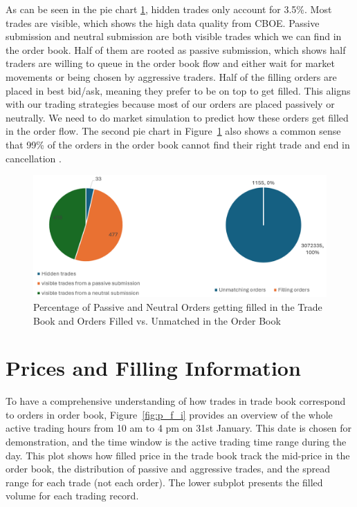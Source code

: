 As can be seen in the pie chart \ref{fig:p_of_AT_unma}, hidden trades only account for 3.5\%. Most trades are visible, which shows the high data quality from CBOE. Passive submission and neutral submission are both visible trades which we can find in the order book. Half of them are rooted as passive submission, which shows half traders are willing to queue in the order book flow and either wait for market movements or being chosen by aggressive traders. Half of the filling orders are placed in best bid/ask, meaning they prefer to be on top to get filled. This aligns with our trading strategies because most of our orders are placed passively or neutrally. We need to do market simulation to predict how these orders get filled in the order flow. The second pie chart in Figure~\ref{fig:p_of_AT_unma} also shows a common sense that 99\% of the orders in the order book cannot find their right trade and end in cancellation \citep{gould2013limitorderbooks}.

\begin{figure}[h]
    \centering
    \includegraphics[width=0.8\linewidth]{figures/percentage_of_AT_unmatch.png}
    \caption{Percentage of Passive and Neutral Orders getting filled in the Trade Book and Orders Filled vs. Unmatched in the Order Book}
    \label{fig:p_of_AT_unma}
\end{figure}


\section{Prices and Filling Information} \label{sec:price}
To have a comprehensive understanding of how trades in trade book correspond to orders in order book, Figure~\ref{fig:p_f_i} provides an overview of the whole active trading hours from 10 am to 4 pm on 31st January. This date is chosen for demonstration, and the time window is the active trading time range during the day. This plot shows how filled price in the trade book track the mid-price in the order book, the distribution of passive and aggressive trades, and the spread range for each trade (not each order). The lower subplot presents the filled volume for each trading record.

